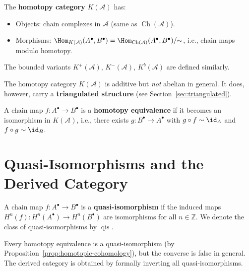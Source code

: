 \begin{definition}\label{def:homotopy-category}
The \textbf{homotopy category} $K(\mathcal{A})$ has:
\begin{itemize}
    \item Objects: chain complexes in $\mathcal{A}$ (same as $\operatorname{Ch}(\mathcal{A})$).
    \item Morphisms: $\Hom_{K(\mathcal{A})}(A^\bullet, B^\bullet) =
    \Hom_{\operatorname{Ch}(\mathcal{A})}(A^\bullet, B^\bullet) / {\sim}$,
    i.e., chain maps modulo homotopy.
\end{itemize}
The bounded variants $K^+(\mathcal{A})$, $K^-(\mathcal{A})$, $K^b(\mathcal{A})$ are
defined similarly.
\end{definition}

\begin{remark}\label{rem:homotopy-not-abelian}
The homotopy category $K(\mathcal{A})$ is additive but \emph{not} abelian in general.
It does, however, carry a \textbf{triangulated structure}
(see Section~\ref{sec:triangulated}).
\end{remark}

\begin{definition}\label{def:homotopy-equivalence}
A chain map $f \colon A^\bullet \to B^\bullet$ is a \textbf{homotopy equivalence} if
it becomes an isomorphism in $K(\mathcal{A})$, i.e., there exists $g \colon B^\bullet \to A^\bullet$
with $g \circ f \sim \id_A$ and $f \circ g \sim \id_B$.
\end{definition}


\section{Quasi-Isomorphisms and the Derived Category}\label{sec:derived-cat}

\begin{definition}\label{def:quasi-iso}
A chain map $f \colon A^\bullet \to B^\bullet$ is a \textbf{quasi-isomorphism} if the induced
maps $H^n(f) \colon H^n(A^\bullet) \to H^n(B^\bullet)$ are isomorphisms for all $n \in \mathbb{Z}$.
We denote the class of quasi-isomorphisms by $\operatorname{qis}$.
\end{definition}

\begin{remark}\label{rem:homotopy-vs-quasi}
Every homotopy equivalence is a quasi-isomorphism (by Proposition~\ref{prop:homotopic-cohomology}),
but the converse is false in general. The derived category is obtained by formally
inverting all quasi-isomorphisms.
\end{remark}

